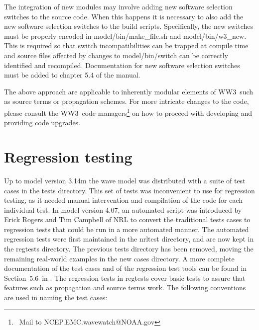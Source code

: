 \documentclass[12pt]{article}
\newcommand{\manref}{tol:MMABmanual}
\newcommand{\manregtestsec}{5.6}
\newcommand{\ws}{WW3}
\newcommand{\file}{\sf}
\newcommand{\pb}{\strut \vfill \pagebreak}
\newcommand{\newsec}{\setcounter{equation}{0}
                      \setcounter{myfigno}{0}
                      \setcounter{mytabno}{0}}
\newcounter{myfigno}[section]
\newcounter{mytabno}[section]
\begin{document}
\vspace{\baselineskip} \noindent The integration of new modules may involve
adding new software selection switches to the source code. When this happens
it is necessary to also add the new software selection switches to the build
scripts.  Specifically, the new switches must be properly encoded in {\file
  model/bin/make\_file.sh} and {\file model/bin/w3\_new}. This is required so
that switch incompatibilities can be trapped at compile time and source files
affected by changes to {\file model/bin/switch} can be correctly identified
and recompiled. Documentation for new software selection switches must be
added to chapter 5.4 of the manual.

\vspace{\baselineskip} \noindent The above approach are applicable to
inherently modular elements of \ws\ such as source terms or propagation
schemes. For more intricate changes to the code, please consult the \ws\ code
managers\footnote{~Mail to NCEP.EMC.wavewatch@NOAA.gov} on how to proceed with
developing and providing code upgrades.


\pb
\section{Regression testing} \label{sec:testing}
\newsec

Up to model version 3.14m the wave model was distributed with a suite of test
cases in the {\file tests} directory. This set of tests was inconvenient to
use for regression testing, as it needed manual intervention and compilation
of the code for each individual test. In model version 4.07, an automated
script was introduced by Erick Rogers and Tim Campbell of NRL to convert the
traditional tests cases to regression tests that could be run in a more
automated manner. The automated regression tests were first maintained in the
{\file nrltest} directory, and are now kept in the {\file regtests} directory.
The previous {\file tests} directory has been removed, moving the remaining
real-world examples in the new {\file cases} directory. A more complete
documentation of the test cases and of the regression test tools can be found
in Section~\manregtestsec\ in \cite{\manref}.  The regression tests in {\file
  regtests} cover basic tests to assure that features such as propagation and
source terms work. The following conventions are used in naming the test
cases:
\end{document}

